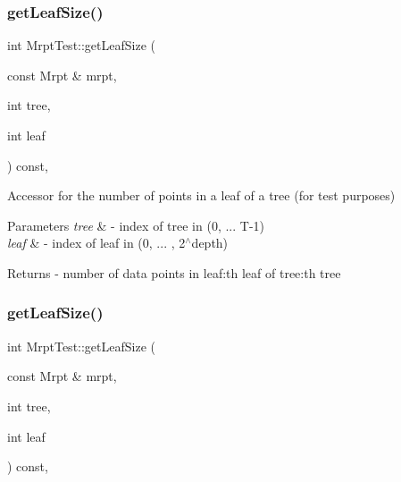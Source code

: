 \subsubsection{\texorpdfstring{get\+Leaf\+Size()}{getLeafSize()}\hspace{0.1cm}{\footnotesize\ttfamily [1/2]}}
{\footnotesize\ttfamily int Mrpt\+Test\+::get\+Leaf\+Size (\begin{DoxyParamCaption}\item[{const Mrpt \&}]{mrpt,  }\item[{int}]{tree,  }\item[{int}]{leaf }\end{DoxyParamCaption}) const\hspace{0.3cm}{\ttfamily [inline]}, {\ttfamily [protected]}}

Accessor for the number of points in a leaf of a tree (for test purposes) 
\begin{DoxyParams}{Parameters}
{\em tree} & -\/ index of tree in (0, ... T-\/1) \\
\hline
{\em leaf} & -\/ index of leaf in (0, ... , 2$^\wedge$depth) \\
\hline
\end{DoxyParams}
\begin{DoxyReturn}{Returns}
-\/ number of data points in leaf\+:th leaf of tree\+:th tree 
\end{DoxyReturn}
\mbox{\label{class_mrpt_test_a2f93e8ec8143904d8a8a0989e46c8e07}} 
\subsubsection{\texorpdfstring{get\+Leaf\+Size()}{getLeafSize()}\hspace{0.1cm}{\footnotesize\ttfamily [2/2]}}
{\footnotesize\ttfamily int Mrpt\+Test\+::get\+Leaf\+Size (\begin{DoxyParamCaption}\item[{const Mrpt \&}]{mrpt,  }\item[{int}]{tree,  }\item[{int}]{leaf }\end{DoxyParamCaption}) const\hspace{0.3cm}{\ttfamily [inline]}, {\ttfamily [protected]}}

